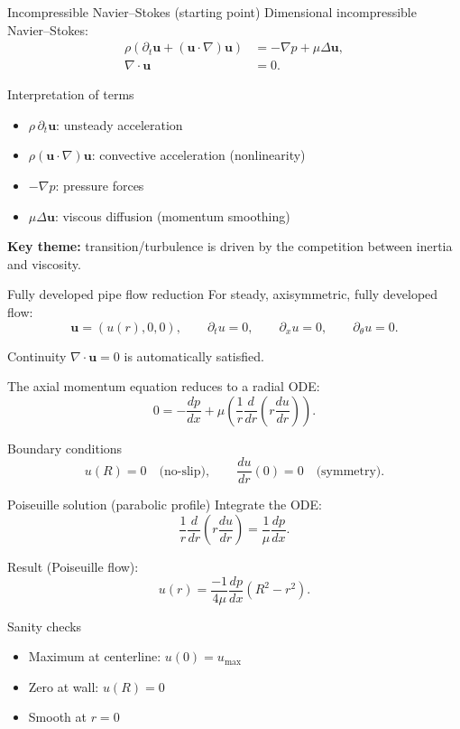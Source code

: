 \documentclass[aspectratio=169]{beamer}
\newcommand{\uu}{\bm{u}}
\newcommand{\pp}{p}
\newcommand{\grad}{\nabla}
\newcommand{\Div}{\nabla\cdot}
\newcommand{\Lap}{\Delta}
\begin{document}
\begin{frame}{Incompressible Navier--Stokes (starting point)}
Dimensional incompressible Navier--Stokes:
\begin{align*}
\rho\left(\partial_t \uu + (\uu\cdot\grad)\uu\right) &= -\grad \pp + \mu \Lap \uu,\\
\Div \uu &= 0.
\end{align*}

\begin{block}{Interpretation of terms}
\begin{itemize}
  \item $\rho\,\partial_t\uu$: unsteady acceleration
  \item $\rho(\uu\cdot\grad)\uu$: convective acceleration (nonlinearity)
  \item $-\grad p$: pressure forces
  \item $\mu \Lap \uu$: viscous diffusion (momentum smoothing)
\end{itemize}
\end{block}

\textbf{Key theme:} transition/turbulence is driven by the competition between inertia and viscosity.
\end{frame}

\begin{frame}{Fully developed pipe flow reduction}
For steady, axisymmetric, fully developed flow:
\[
\uu = (u(r),0,0),\qquad \partial_t u = 0,\qquad \partial_x u = 0,\qquad \partial_\theta u = 0.
\]

Continuity $\Div\uu=0$ is automatically satisfied.

The axial momentum equation reduces to a radial ODE:
\[
0 = -\frac{d\pp}{dx} + \mu\left(\frac{1}{r}\frac{d}{dr}\left(r\frac{du}{dr}\right)\right).
\]

\begin{block}{Boundary conditions}
\[
u(R)=0 \quad\text{(no-slip)},\qquad \frac{du}{dr}(0)=0 \quad\text{(symmetry)}.
\]
\end{block}
\end{frame}

\begin{frame}{Poiseuille solution (parabolic profile)}
Integrate the ODE:
\[
\frac{1}{r}\frac{d}{dr}\left(r\frac{du}{dr}\right) = \frac{1}{\mu}\frac{d\pp}{dx}.
\]

Result (Poiseuille flow):
\[
u(r)=\frac{-1}{4\mu}\frac{d\pp}{dx}\left(R^2-r^2\right).
\]

\begin{block}{Sanity checks}
\begin{itemize}
  \item Maximum at centerline: $u(0)=u_{\max}$
  \item Zero at wall: $u(R)=0$
  \item Smooth at $r=0$
\end{itemize}
\end{block}
\end{frame}
\end{document}
